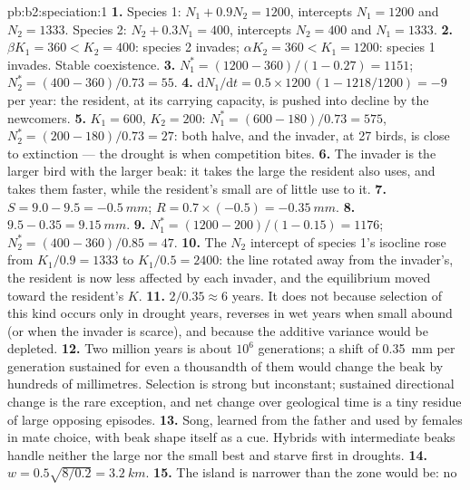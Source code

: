 \begin{solution}{pb:b2:speciation:1}
\textbf{1.} Species 1: $N_1 + 0.9N_2 = 1200$, intercepts $N_1 = 1200$
and $N_2 = 1333$. Species 2: $N_2 + 0.3N_1 = 400$, intercepts $N_2 =
400$ and $N_1 = 1333$.
\textbf{2.} $\beta K_1 = 360 < K_2 = 400$: species 2 invades;
$\alpha K_2 = 360 < K_1 = 1200$: species 1 invades. Stable
coexistence.
\textbf{3.} $N_1^{*} = (1200 - 360)/(1 - 0.27) = 1151$; $N_2^{*} =
(400 - 360)/0.73 = 55$.
\textbf{4.} $\mathrm{d}N_1/\mathrm{d}t = 0.5\times 1200\,(1 - 1218/1200)
= -9$ per year: the resident, at its carrying capacity, is pushed
into decline by the newcomers.
\textbf{5.} $K_1 = 600$, $K_2 = 200$: $N_1^{*} = (600 - 180)/0.73 =
575$, $N_2^{*} = (200 - 180)/0.73 = 27$: both halve, and the invader,
at 27 birds, is close to extinction --- the drought is when
competition bites.
\textbf{6.} The invader is the larger bird with the larger beak: it
takes the large  the resident also uses, and takes them
faster, while the resident's small  are of little use to it.
\textbf{7.} $S = 9.0 - 9.5 = \qty{-0.5}{mm}$; $R = 0.7\times(-0.5) =
\qty{-0.35}{mm}$.
\textbf{8.} $9.5 - 0.35 = \qty{9.15}{mm}$.
\textbf{9.} $N_1^{*} = (1200 - 200)/(1 - 0.15) = 1176$; $N_2^{*} =
(400 - 360)/0.85 = 47$.
\textbf{10.} The $N_2$ intercept of species 1's isocline rose from
$K_1/0.9 = 1333$ to $K_1/0.5 = 2400$: the line rotated away from
the invader's, the resident is now less affected by each invader,
and the equilibrium moved toward the resident's $K$.
\textbf{11.} $2/0.35 \approx 6$ years. It does not because selection
of this kind occurs only in drought years, reverses in wet years
when small  abound (or when the invader is scarce), and
because the additive variance would be depleted.
\textbf{12.} Two million years is about $10^{6}$ generations; a shift
of \qty{0.35}{mm} per generation sustained for even a thousandth of
them would change the beak by hundreds of millimetres. Selection is
strong but inconstant; sustained directional change is the rare
exception, and net change over geological time is a tiny residue
of large opposing episodes.
\textbf{13.} Song, learned from the father and used by females in
mate choice, with beak shape itself as a cue. Hybrids with
intermediate beaks handle neither the large nor the small 
best and starve first in droughts.
\textbf{14.} $w = 0.5\sqrt{8/0.2} = \qty{3.2}{km}$.
\textbf{15.} The island is narrower than the zone would be: no

\end{solution}
